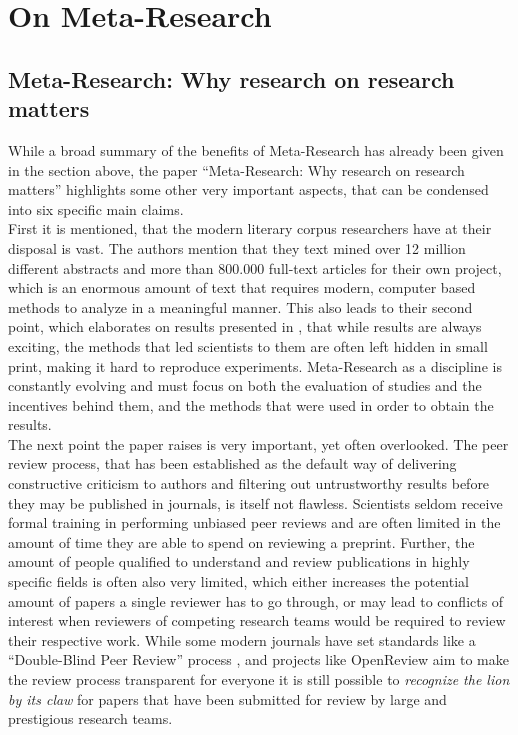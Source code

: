 \documentclass{article}
\begin{document}
\section{On Meta-Research}\label{secmeta}
\subsection{Meta-Research: Why research on research matters}

While a broad summary of the benefits of Meta-Research has already been given in the section above, the paper ``Meta-Research: Why research on research matters'' \cite{metaresearch} highlights some other very important aspects, that can be condensed into six specific main claims. \\
First it is mentioned, that the modern literary corpus researchers have at their disposal is vast. The authors mention that they text mined over 12 million different abstracts and more than 800.000 full-text articles for their own project, which is an enormous amount of text that requires modern, computer based methods to analyze in a meaningful manner. This also leads to their second point, which elaborates on results presented in \cite{biometa}, that while results are always exciting, the methods that led scientists to them are often left hidden in small print, making it hard to reproduce experiments. Meta-Research as a discipline is constantly evolving and must focus on both the evaluation of studies and the incentives behind them, and the methods that were used in order to obtain the results.\\
The next point the paper raises is very important, yet often overlooked. The peer review process, that has been established as the default way of delivering constructive criticism to authors and filtering out untrustworthy results before they may be published in journals, is itself not flawless. Scientists seldom receive formal training in performing unbiased peer reviews and are often limited in the amount of time they are able to spend on reviewing a preprint. Further, the amount of people qualified to understand and review publications in highly specific fields is often also very limited, which either increases the potential amount of papers a single reviewer has to go through, or may lead to conflicts of interest when reviewers of competing research teams would be required to review their respective work. While some modern journals have set standards like a ``Double-Blind Peer Review'' process \cite{elsevier}, and projects like OpenReview \cite{openreview} aim to make the review process transparent for everyone it is still possible to \textit{recognize the lion by its claw} for papers that have been submitted for review by large and prestigious research teams. \\
\end{document}
